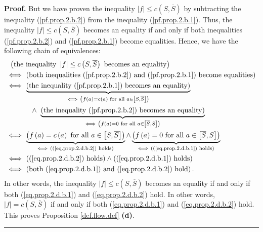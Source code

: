 \documentclass[numbers=enddot,12pt,final,onecolumn,notitlepage]{scrartcl}%
\theoremstyle{definition}
\newenvironment{proof}[1][Proof]{\noindent\textbf{#1.} }{\ \rule{0.5em}{0.5em}}
\begin{document}
\begin{proof}
But we have proven the inequality $\left\vert f\right\vert \leq c\left(
S,\overline{S}\right)  $ by subtracting the inequality (\ref{pf.prop.2.b.2})
from the inequality (\ref{pf.prop.2.b.1}). Thus, the inequality $\left\vert
f\right\vert \leq c\left(  S,\overline{S}\right)  $ becomes an equality if and
only if both inequalities (\ref{pf.prop.2.b.2}) and (\ref{pf.prop.2.b.1})
become equalities. Hence, we have the following chain of equivalences:%
\begin{align*}
&  \ \left(  \text{the inequality }\left\vert f\right\vert \leq c\left(
S,\overline{S}\right)  \text{ becomes an equality}\right) \\
&  \Longleftrightarrow\ \left(  \text{both inequalities (\ref{pf.prop.2.b.2})
and (\ref{pf.prop.2.b.1}) become equalities}\right) \\
&  \Longleftrightarrow\ \underbrace{\left(  \text{the inequality
(\ref{pf.prop.2.b.1}) becomes an equality}\right)  }_{\Longleftrightarrow
\ \left(  f\left(  a\right)  =c\left(  a\right)  \text{ for all }a\in\left[
S,\overline{S}\right]  \right)  }\\
&  \ \ \ \ \ \ \ \ \ \ \wedge\ \underbrace{\left(  \text{the inequality
(\ref{pf.prop.2.b.2}) becomes an equality}\right)  }_{\Longleftrightarrow
\ \left(  f\left(  a\right)  =0\text{ for all }a\in\left[  \overline
{S},S\right]  \right)  }\\
&  \Longleftrightarrow\ \underbrace{\left(  f\left(  a\right)  =c\left(
a\right)  \text{ for all }a\in\left[  S,\overline{S}\right]  \right)
}_{\Longleftrightarrow\ \left(  \text{(\ref{eq.prop.2.d.b.2}) holds}\right)
}\wedge\underbrace{\left(  f\left(  a\right)  =0\text{ for all }a\in\left[
\overline{S},S\right]  \right)  }_{\Longleftrightarrow\ \left(
\text{(\ref{eq.prop.2.d.b.1}) holds}\right)  }\\
&  \Longleftrightarrow\ \left(  \text{(\ref{eq.prop.2.d.b.2}) holds}\right)
\wedge\left(  \text{(\ref{eq.prop.2.d.b.1}) holds}\right) \\
&  \Longleftrightarrow\ \left(  \text{both (\ref{eq.prop.2.d.b.1}) and
(\ref{eq.prop.2.d.b.2}) hold}\right)  .
\end{align*}
In other words, the inequality $\left\vert f\right\vert \leq c\left(
S,\overline{S}\right)  $ becomes an equality if and only if both
(\ref{eq.prop.2.d.b.1}) and (\ref{eq.prop.2.d.b.2}) hold. In other words,
$\left\vert f\right\vert =c\left(  S,\overline{S}\right)  $ if and only if
both (\ref{eq.prop.2.d.b.1}) and (\ref{eq.prop.2.d.b.2}) hold. This proves
Proposition \ref{def.flow.def} \textbf{(d)}.
\end{proof}
\end{document}
